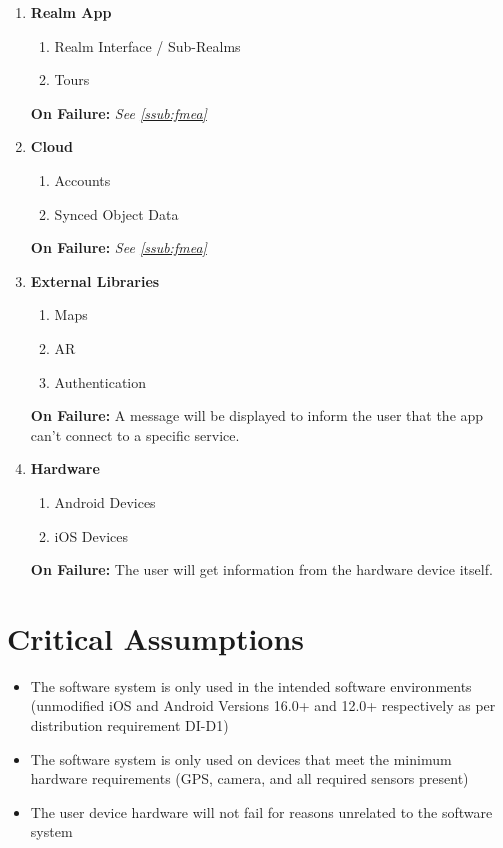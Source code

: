 \documentclass{article}
\begin{document}
\begin{enumerate}[label=\textbf{\arabic*.}]
    \item \textbf{Realm App}
    \begin{enumerate}
        \item Realm Interface / Sub-Realms
        \item Tours
    \end{enumerate}
    \textbf{On Failure:} \emph{See \ref{ssub:fmea}}
    \item \textbf{Cloud}
    \begin{enumerate}
        \item Accounts
        \item Synced Object Data
    \end{enumerate}
    \textbf{On Failure:} \emph{See \ref{ssub:fmea}}
    \item \textbf{External Libraries}
    \begin{enumerate}
        \item Maps
        \item AR
        \item Authentication
    \end{enumerate}
    \textbf{On Failure:} A message will be displayed to inform the user that the app can't connect to a specific service.
    \item \textbf{Hardware}
    \begin{enumerate}
        \item Android Devices
        \item iOS Devices
    \end{enumerate}
    \textbf{On Failure:} The user will get information from the hardware device itself.
\end{enumerate}

\section{Critical Assumptions}

\begin{itemize}
    \item The software system is only used in the intended software environments (unmodified iOS and Android Versions 16.0+ and 12.0+ respectively as per distribution requirement DI-D1)
    \item The software system is only used on devices that meet the minimum hardware requirements (GPS, camera, and all required sensors present)
    \item The user device hardware will not fail for reasons unrelated to the software system
\end{itemize}
\end{document}
